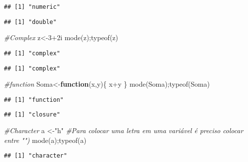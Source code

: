 \documentclass[
]{book}
\newenvironment{Shaded}{\begin{snugshade}}{\end{snugshade}}
\newcommand{\CommentTok}[1]{\textcolor[rgb]{0.56,0.35,0.01}{\textit{#1}}}
\newcommand{\ControlFlowTok}[1]{\textcolor[rgb]{0.13,0.29,0.53}{\textbf{#1}}}
\newcommand{\DecValTok}[1]{\textcolor[rgb]{0.00,0.00,0.81}{#1}}
\newcommand{\FunctionTok}[1]{\textcolor[rgb]{0.00,0.00,0.00}{#1}}
\newcommand{\NormalTok}[1]{#1}
\newcommand{\OtherTok}[1]{\textcolor[rgb]{0.56,0.35,0.01}{#1}}
\newcommand{\SpecialCharTok}[1]{\textcolor[rgb]{0.00,0.00,0.00}{#1}}
\newcommand{\StringTok}[1]{\textcolor[rgb]{0.31,0.60,0.02}{#1}}
\begin{document}
\begin{verbatim}
## [1] "numeric"
\end{verbatim}

\begin{verbatim}
## [1] "double"
\end{verbatim}

\begin{Shaded}
\begin{Highlighting}[]
\CommentTok{\#Complex}
\NormalTok{z}\OtherTok{\textless{}{-}}\DecValTok{3}\SpecialCharTok{+}\NormalTok{2i}
\FunctionTok{mode}\NormalTok{(z);}\FunctionTok{typeof}\NormalTok{(z)}
\end{Highlighting}
\end{Shaded}

\begin{verbatim}
## [1] "complex"
\end{verbatim}

\begin{verbatim}
## [1] "complex"
\end{verbatim}

\begin{Shaded}
\begin{Highlighting}[]
\CommentTok{\#function}
\NormalTok{Soma}\OtherTok{\textless{}{-}}\ControlFlowTok{function}\NormalTok{(x,y)\{}
\NormalTok{  x}\SpecialCharTok{+}\NormalTok{y}
\NormalTok{\}}
\FunctionTok{mode}\NormalTok{(Soma);}\FunctionTok{typeof}\NormalTok{(Soma)}
\end{Highlighting}
\end{Shaded}

\begin{verbatim}
## [1] "function"
\end{verbatim}

\begin{verbatim}
## [1] "closure"
\end{verbatim}

\begin{Shaded}
\begin{Highlighting}[]
\CommentTok{\#Character}
\NormalTok{a }\OtherTok{\textless{}{-}}\StringTok{"h"} \CommentTok{\#Para colocar uma letra em uma variável é preciso colocar entre "")}
\FunctionTok{mode}\NormalTok{(a);}\FunctionTok{typeof}\NormalTok{(a)}
\end{Highlighting}
\end{Shaded}

\begin{verbatim}
## [1] "character"
\end{verbatim}
\end{document}
